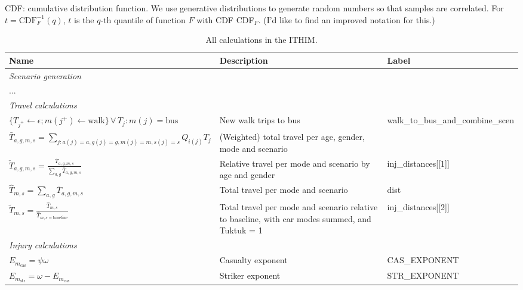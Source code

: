 \documentclass{article}
\begin{document}
\begin{appendix}
\begin{landscape}
\begin{center}
\begin{ThreePartTable}
  \begin{TableNotes}  
  \small
  \item[\textdagger] {\footnotesize CDF: cumulative distribution function. We use generative distributions to generate random numbers so that samples are correlated. For $t=\text{CDF}_{F}^{-1}(q)$, $t$ is the $q$-th quantile of function $F$ with CDF CDF$_F$. (I'd like to find an improved notation for this.)}
  \end{TableNotes}
\begin{longtable}{lp{7cm}p{5cm}}
\caption{\small All calculations in the ITHIM.}\label{calculationstab}\\
Name & Description & Label \\
\hline
\multicolumn{3}{l}{\textit{Scenario generation}}\\
\hline
...&&\\[5pt]
\hline
\multicolumn{3}{l}{\textit{Travel calculations}}\\
\hline
$\{T_{j^+}\leftarrow \epsilon; m(j^+)\leftarrow\text{walk}\}\, \forall\, T_j:m(j)=\text{bus}$ &New walk trips to bus&{walk\_to\_bus\_and\_combine\_scen}\\[5pt]
$\bar{T}_{a,g,m,s}=\sum_{j:a(j)=a,g(j)=g,m(j)=m,s(j)=s}Q_{i(j)}T_j$ & (Weighted) total travel per age, gender, mode and scenario &  \\[5pt]
$\check{T}_{a,g,m,s}=\frac{\bar{T}_{a,g,m,s}}{\sum_{a,g}\bar{T}_{a,g,m,s}}$ & Relative travel per mode and scenario by age and gender & inj\_distances[[1]] \\[5pt]
$\hat{T}_{m,s}=\sum_{a,g}\bar{T}_{a,g,m,s}$ & Total travel per mode and scenario & dist \\[5pt]
$\tilde{T}_{m,s}=\frac{\hat{T}_{m,s}}{\hat{T}_{m,s=\text{baseline}}}$ & Total travel per mode and scenario relative to baseline, with car modes summed, and Tuktuk = 1 &  inj\_distances[[2]] \\[5pt]
\hline
\multicolumn{3}{l}{\textit{Injury calculations}}\\
\hline

$E_{m_{\text{cas}}}=\psi\omega$ & Casualty exponent & CAS\_EXPONENT  \\[5pt]

$E_{m_{\text{str}}}=\omega-E_{m_{\text{cas}}}$ & Striker exponent & STR\_EXPONENT \\[5pt]


\end{longtable}
\end{ThreePartTable}
\end{center}
\end{landscape}
\end{appendix}
\end{document}
